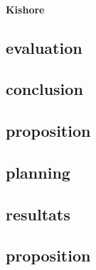 \paragraph{Kishore}



\subsection {evaluation}



\subsection {conclusion}


\subsection {proposition}



\subsection {planning}


\subsection{resultats}

\subsection{proposition}




